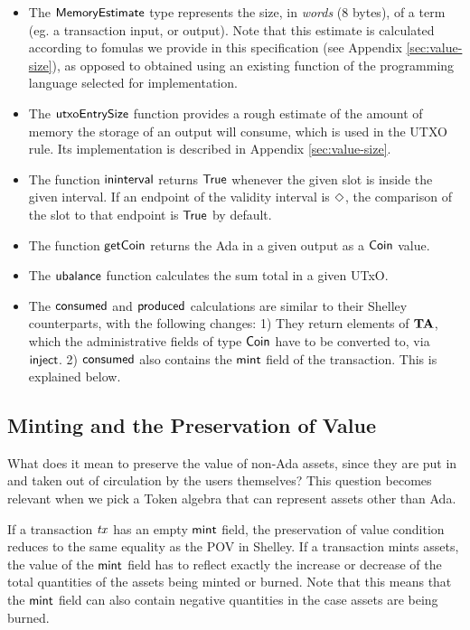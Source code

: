 \begin{itemize}
  \item The $\mathsf{MemoryEstimate}$ type represents the size, in \emph{words} (8 bytes), of
  a term (eg. a transaction input, or output). Note that this estimate is calculated
  according to fomulas we provide in this specification (see Appendix \ref{sec:value-size}),
  as opposed to obtained using an existing function of the programming
  language selected for implementation.

  \item The $\mathsf{utxoEntrySize}$ function provides a rough estimate of
    the amount of memory the storage of an output will consume, which is used in the UTXO rule.
    Its implementation is described in Appendix \ref{sec:value-size}.

  \item The function $\mathsf{ininterval}$ returns $\mathsf{True}$ whenever the given slot is
  inside the given interval. If an endpoint of the validity interval
  is $\Diamond$, the comparison of the slot to that endpoint is $\mathsf{True}$ by default.

  \item The function $\mathsf{getCoin}$ returns the Ada in a given output as a $\mathsf{Coin}$ value.

  \item The $\mathsf{ubalance}$ function calculates the sum total in a given UTxO.

  \item The $\mathsf{consumed}$ and $\mathsf{produced}$ calculations are similar to their Shelley
    counterparts, with the following changes: 1) They return elements of $\mathbf{TA}$, which
    the administrative fields of type $\mathsf{Coin}$ have to be converted to, via $\mathsf{inject}$.
    2) $\mathsf{consumed}$ also contains the $\mathsf{mint}$ field of the transaction.
    This is explained below.
\end{itemize}

\subsection*{Minting and the Preservation of Value}
What does it mean to preserve the value of non-Ada assets, since they
are put in and taken out of circulation by the users themselves? This
question becomes relevant when we pick a Token algebra that can represent
assets other than Ada.

If a transaction $\mathit{tx}$ has an empty $\mathsf{mint}$ field, the preservation
of value condition reduces to the same equality as the POV in Shelley. If a transaction
mints assets, the value of the $\mathsf{mint}$ field has to reflect exactly
the increase or decrease of the total quantities of the assets being
minted or burned. Note that this means that the
$\mathsf{mint}$ field can also contain negative quantities in the case assets
are being burned.

